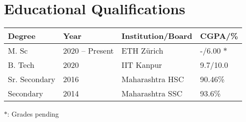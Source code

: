 \setlength\extrarowheight{3pt}  %

\section*{Educational Qualifications}
\begin{tabularx}{\textwidth}{L L L L}

\toprule
\textbf{Degree} & \textbf{Year} & \textbf{Institution/Board} & \textbf{CGPA/\%}\\
\midrule
M. Sc & 2020 -- Present & ETH Zürich & -/6.00 $\ast$ \\%
B. Tech & 2020 & IIT Kanpur & 9.7/10.0\\
Sr. Secondary & 2016 & Maharashtra HSC & 90.46\%\\
Secondary & 2014 & Maharashtra SSC & 93.6\%\\
\bottomrule

\end{tabularx}

\vspace{2mm}
{\small $\ast$: Grades pending}
